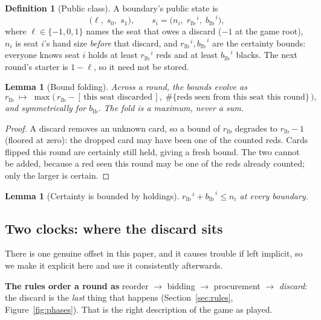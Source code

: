 \documentclass[11pt]{article}
\theoremstyle{plain}
\newtheorem{lemma}[theorem]{Lemma}
\theoremstyle{definition}
\newtheorem{definition}[theorem]{Definition}
\theoremstyle{remark}
\newcommand{\seat}[1]{\ensuremath{s_{#1}}}
\newcommand{\rlb}{\ensuremath{r_{\mathrm{lb}}}}
\newcommand{\blb}{\ensuremath{b_{\mathrm{lb}}}}
\begin{document}
\begin{definition}[Public class]\label{def:class}
A boundary's public state is
\[
  \bigl(\ell,\; \seat{0},\; \seat{1}\bigr),\qquad
  \seat{i}=\bigl(n_i,\;\rlb^{\,i},\;\blb^{\,i}\bigr),
\]
where $\ell\in\{-1,0,1\}$ names the seat that owes a discard ($-1$ at the
game root), $n_i$ is seat $i$'s hand size \emph{before} that discard, and
$\rlb^{\,i},\blb^{\,i}$ are the certainty bounds: everyone knows seat $i$
holds at least $\rlb^{\,i}$ reds and at least $\blb^{\,i}$ blacks. The next
round's starter is $1-\ell$, so it need not be stored.
\end{definition}

\begin{lemma}[Bound folding]\label{lem:fold}
Across a round, the bounds evolve as
\[
  \rlb \;\longmapsto\; \max\bigl(\,\rlb-[\,\text{this seat discarded}\,],\;
                        \#\{\text{reds seen from this seat this round}\}\,\bigr),
\]
and symmetrically for $\blb$. The fold is a maximum, never a sum.
\end{lemma}

\begin{proof}
A discard removes an unknown card, so a bound of $\rlb$ degrades to
$\rlb-1$ (floored at zero): the dropped card may have been one of the
counted reds. Cards flipped this round are certainly still held, giving a
fresh bound. The two cannot be added, because a red seen this round may be
one of the reds already counted; only the larger is certain.
\end{proof}

\begin{lemma}[Certainty is bounded by holdings]\label{lem:cap}
$\rlb^{\,i}+\blb^{\,i}\le n_i$ at every boundary.
\end{lemma}

\subsection{Two clocks: where the discard sits}\label{sec:twoclocks}

There is one genuine offset in this paper, and it causes trouble if left
implicit, so we make it explicit here and use it consistently afterwards.

\textbf{The rules order a round as} reorder $\to$ bidding $\to$ procurement
$\to$ \emph{discard}: the discard is the \emph{last} thing that happens
(Section~\ref{sec:rules}, Figure~\ref{fig:phases}). That is the right
description of the game as played.
\end{document}
